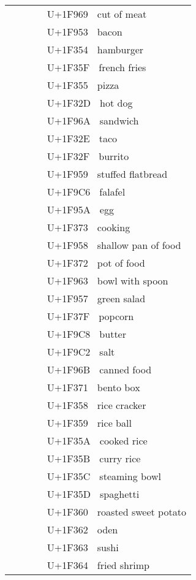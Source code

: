 \documentclass[a4paper,12pt]{ltjarticle}
\newcommand{\fontA}[1]{{\fontspec[RawFeature={mode=harf,+dist,+ccmp}]{Segoe UI Emoji} #1}}
\newcommand{\fontB}[1]{{\fontspec[RawFeature={mode=harf,+dist,+ccmp}]{Noto Color Emoji} #1}}
\begin{document}
\begin{longtable}[c]{ccp{0.8\linewidth}}
\fontA{🥩}&\fontB{🥩}&U+1F969 🥩 cut of meat\\
\fontA{🥓}&\fontB{🥓}&U+1F953 🥓 bacon\\
\fontA{🍔}&\fontB{🍔}&U+1F354 🍔 hamburger\\
\fontA{🍟}&\fontB{🍟}&U+1F35F 🍟 french fries\\
\fontA{🍕}&\fontB{🍕}&U+1F355 🍕 pizza\\
\fontA{🌭}&\fontB{🌭}&U+1F32D 🌭 hot dog\\
\fontA{🥪}&\fontB{🥪}&U+1F96A 🥪 sandwich\\
\fontA{🌮}&\fontB{🌮}&U+1F32E 🌮 taco\\
\fontA{🌯}&\fontB{🌯}&U+1F32F 🌯 burrito\\
\fontA{🥙}&\fontB{🥙}&U+1F959 🥙 stuffed flatbread\\
\fontA{🧆}&\fontB{🧆}&U+1F9C6 🧆 falafel\\
\fontA{🥚}&\fontB{🥚}&U+1F95A 🥚 egg\\
\fontA{🍳}&\fontB{🍳}&U+1F373 🍳 cooking\\
\fontA{🥘}&\fontB{🥘}&U+1F958 🥘 shallow pan of food\\
\fontA{🍲}&\fontB{🍲}&U+1F372 🍲 pot of food\\
\fontA{🥣}&\fontB{🥣}&U+1F963 🥣 bowl with spoon\\
\fontA{🥗}&\fontB{🥗}&U+1F957 🥗 green salad\\
\fontA{🍿}&\fontB{🍿}&U+1F37F 🍿 popcorn\\
\fontA{🧈}&\fontB{🧈}&U+1F9C8 🧈 butter\\
\fontA{🧂}&\fontB{🧂}&U+1F9C2 🧂 salt\\
\fontA{🥫}&\fontB{🥫}&U+1F96B 🥫 canned food\\
\fontA{🍱}&\fontB{🍱}&U+1F371 🍱 bento box\\
\fontA{🍘}&\fontB{🍘}&U+1F358 🍘 rice cracker\\
\fontA{🍙}&\fontB{🍙}&U+1F359 🍙 rice ball\\
\fontA{🍚}&\fontB{🍚}&U+1F35A 🍚 cooked rice\\
\fontA{🍛}&\fontB{🍛}&U+1F35B 🍛 curry rice\\
\fontA{🍜}&\fontB{🍜}&U+1F35C 🍜 steaming bowl\\
\fontA{🍝}&\fontB{🍝}&U+1F35D 🍝 spaghetti\\
\fontA{🍠}&\fontB{🍠}&U+1F360 🍠 roasted sweet potato\\
\fontA{🍢}&\fontB{🍢}&U+1F362 🍢 oden\\
\fontA{🍣}&\fontB{🍣}&U+1F363 🍣 sushi\\
\fontA{🍤}&\fontB{🍤}&U+1F364 🍤 fried shrimp\\

\end{longtable}
\end{document}
